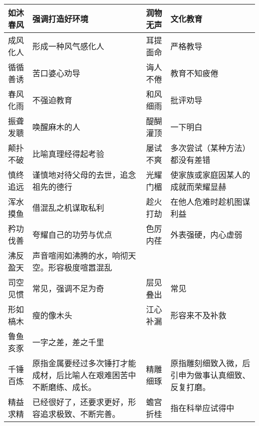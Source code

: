 \begin{longtable}{|p{}|p{}|p{}|p{}|}
    \hline
    如沐春风        & 强调打造好环境                            & 润物无声        & 文化教育                      \\
    \hline
    成风化人        & 形成一种风气感化人                          & 耳提面命        & 严格教导                      \\
    \hline
    循循善诱        & 苦口婆心劝导                             & 诲人不倦        & 教育不知疲倦                    \\
    \hline
    春风化雨        & 不强迫教育                              & 和风细雨        & 批评劝导                      \\
    \hline
    振聋发聩        & 唤醒麻木的人                             & 醍醐灌顶        & 一下明白                      \\
    \hline
    颠扑不破        & 比喻真理经得起考验                          & 屡试不爽        & 多次尝试（某种方法）都没有差错           \\
    \hline
    慎终追远        & 谨慎地对待父母的去世，追念祖先的德行                 & 光耀门楣        & 使家族或家庭因某人的成就而荣耀显赫         \\
    \hline
    浑水摸鱼        & 借混乱之机谋取私利                          & 趁火打劫        & 在他人危难时趁机图谋利益              \\
    \hline
    矜功伐善        & 夸耀自己的功劳与优点                         & 色厉内荏        & 外表强硬，内心虚弱                 \\
    \hline
    沸反盈天        & 声音喧闹如沸腾的水，响彻天空。形容极度喧嚣混乱            &             &                           \\
    \hline
    司空见惯        & 常见，强调不足为奇                          & 层见叠出        & 常见                        \\
    \hline
    形如槁木        & 瘦的像木头                              & 江心补漏        & 形容来不及补救                   \\
    \hline
    鲁鱼亥豕        & 一字之差，差之千里                          &             &                           \\
    \hline
    千锤百炼        & 原指金属要经过多次锤打才能成材，后比喻人在艰难困苦中不断磨练、成长。 & 精雕细琢        & 原指雕刻细致入微，后引申为做事认真细致、反复打磨。 \\
    \hline
    精益求精        & 已经很好了，还要求更好，形容追求极致、不断完善。           & 蟾宫折桂        & 指在科举应试得中                  \\
    \hline
\end{longtable}

